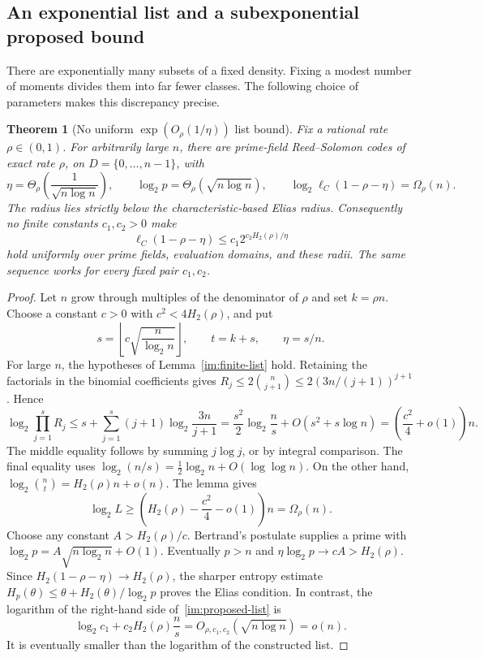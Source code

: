 \documentclass[11pt,letterpaper]{article}
\newtheorem{theorem}{Theorem}[section]
\theoremstyle{definition}
\theoremstyle{remark}
\begin{document}
\subsection{An exponential list and a subexponential proposed bound}

There are exponentially many subsets of a fixed density. Fixing a modest
number of moments divides them into far fewer classes. The following choice
of parameters makes this discrepancy precise.

\begin{theorem}[No uniform $\exp(O_\rho(1/\eta))$ list bound]
\label{im:all-list}
Fix a rational rate $\rho\in(0,1)$. For arbitrarily large $n$, there are
prime-field Reed--Solomon codes of exact rate $\rho$, on
$D=\{0,\ldots,n-1\}$, with
\[
 \eta=\Theta_\rho\!\left(\frac1{\sqrt{n\log n}}\right),\qquad
 \log_2p=\Theta_\rho(\sqrt{n\log n}),\qquad
 \log_2\ell_C(1-\rho-\eta)=\Omega_\rho(n).
\]
The radius lies strictly below the characteristic-based Elias radius.
Consequently no finite constants $c_1,c_2>0$ make
\begin{equation}\label{im:proposed-list}
 \ell_C(1-\rho-\eta)\le c_1 2^{c_2H_2(\rho)/\eta}
\end{equation}
hold uniformly over prime fields, evaluation domains, and these radii.
The same sequence works for every fixed pair $c_1,c_2$.
\end{theorem}
\begin{proof}
Let $n$ grow through multiples of the denominator of $\rho$ and set
$k=\rho n$. Choose a constant $c>0$ with $c^2<4H_2(\rho)$, and put
\[
 s=\left\lfloor c\sqrt{\frac n{\log_2n}}\right\rfloor,
 \qquad t=k+s,\qquad\eta=s/n.
\]
For large $n$, the hypotheses of Lemma~\ref{im:finite-list} hold.
Retaining the factorials in the binomial coefficients gives
$R_j\le2\binom n{j+1}\le2(3n/(j+1))^{j+1}$. Hence
\[
 \log_2\prod_{j=1}^sR_j
 \le s+\sum_{j=1}^s(j+1)\log_2\frac{3n}{j+1}
 =\frac{s^2}{2}\log_2\frac ns+O(s^2+s\log n)
 =\left(\frac{c^2}4+o(1)\right)n.
\]
The middle equality follows by summing $j\log j$, or by integral
comparison. The final equality uses
$\log_2(n/s)=\tfrac12\log_2n+O(\log\log n)$.
On the other hand, $\log_2\binom nt=H_2(\rho)n+o(n)$. The lemma gives
\begin{equation}\label{im:exponential-bank}
 \log_2L\ge\left(H_2(\rho)-\frac{c^2}4-o(1)\right)n=\Omega_\rho(n).
\end{equation}
Choose any constant $A>H_2(\rho)/c$. Bertrand's postulate supplies a prime with
$\log_2p=A\sqrt{n\log_2n}+O(1)$. Eventually $p>n$ and
$\eta\log_2p\to cA>H_2(\rho)$. Since
$H_2(1-\rho-\eta)\to H_2(\rho)$, the sharper entropy estimate
$H_p(\theta)\le\theta+H_2(\theta)/\log_2p$ proves the Elias condition.
In contrast, the logarithm of the right-hand side
of~\eqref{im:proposed-list} is
\[
 \log_2c_1+c_2H_2(\rho)\frac ns
 =O_{\rho,c_1,c_2}(\sqrt{n\log n})=o(n).
\]
It is eventually smaller than the logarithm of the constructed list.
\end{proof}
\end{document}

